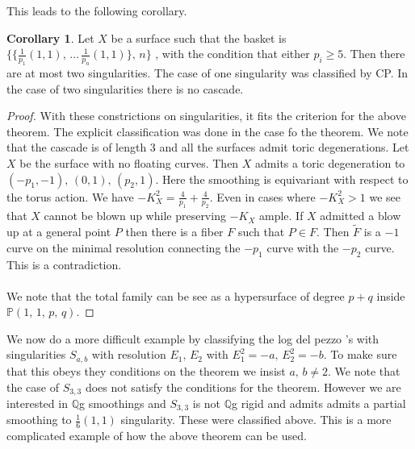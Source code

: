 \documentclass[11pt]{report}
\theoremstyle{definition}
\theoremstyle{definition}
\newtheorem{cor}[thm]{Corollary}
\theoremstyle{definition}
\theoremstyle{definition}
\theoremstyle{definition}
\theoremstyle{definition}
\theoremstyle{definition}
\theoremstyle{definition}
\newcommand{\ldp}{log del pezzo }
\newcommand{\mb}[1]{\mathbb{#1}}
\begin{document}
 This leads to the following corollary.
\begin{cor}
Let $X$ be a surface such that the basket is  $\{ \{ \frac{1}{p_1}(1,1), \, \dots \, \frac{1}{p_n}(1,1) \}, \, n \}$ , with the condition that either $p_i \geq 5$. Then there are at most two singularities. The case of one singularity was classified by CP. In the case of two singularities there is no cascade. 
\end{cor}
\begin{proof}
With these constrictions on singularities, it fits the criterion for the above theorem. The explicit classification was done in the case fo the theorem. We note that the cascade is of length 3 and all the surfaces admit toric degenerations. Let $X$ be the surface with no floating curves. Then $X$ admits a toric degeneration to $(-p_1, -1), \, (0, 1), \, (p_2, 1)$. Here the smoothing is equivariant with respect to the torus action. We have $-K_X^2 = \frac{4}{p_1} + \frac{4}{p_2}$. Even in cases where $-K_X^2 > 1$ we see that $X$ cannot be blown up while preserving $-K_X$ ample. If $X$ admitted a blow up at a general point $P$ then there is a fiber $F$ such that $P \in F$. Then $\widetilde F$ is a $-1$ curve on the minimal resolution connecting the $-p_1$ curve with the $-p_2$ curve. This is a contradiction.
\\
\\
We note that the total family can be see as a hypersurface of degree $p+q$ inside $\mb{P}(1,\,1,\,p,\,q)$.
\end{proof}
We now do a more difficult example by classifying the \ldp's with singularities $S_{a,b}$ with resolution $E_1, \, E_2$ with $E_1^2 = -a,\, E_2^2 = -b$. To make sure that this obeys they conditions on the theorem we insist $a, \, b \neq 2$. We note that the case of $S_{3,3}$ does not satisfy the conditions for the theorem. However we are interested in $\mb{Q}$g smoothings and $S_{3,3}$ is not $\mb{Q}$g rigid and admits admits a partial smoothing to $\frac{1}{6}(1,1)$ singularity. These were classified above. This is a more complicated example of how the above theorem can be used.
\\
\\
\end{document}
